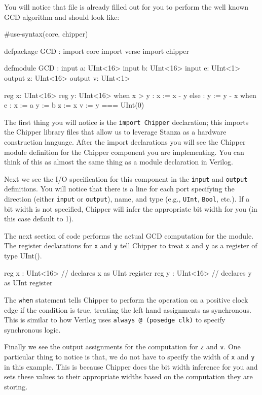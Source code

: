 You will notice that file is already filled out for you to perform the well known GCD algorithm and should look like:

\begin{stanza}
#use-syntax(core, chipper)

defpackage GCD :
   import core
   import verse
   import chipper

defmodule GCD :
   input a: UInt<16>
   input b: UInt<16>
   input e: UInt<1>
   output z: UInt<16>
   output v: UInt<1>

   reg x: UInt<16>
   reg y: UInt<16>
   when x > y :
      x := x - y
   else :
      y := y - x
   when e :
      x := a
      y := b
   z := x
   v := y === UInt(0)
\end{stanza}

The first thing you will notice is the \verb+import Chipper+ declaration; this imports the Chipper library files that allow us to leverage Stanza as a hardware construction language. After the import declarations you will see the Chipper module definition for the Chipper component you are implementing. You can think of this as almost the same thing as a module declaration in Verilog.

Next we see the I/O specification for this component in the \verb+input+ and \verb+output+ definitions. You will notice that there is a line for each port specifying the direction (either \verb+input+ or \verb+output+), name, and type (e.g., \verb+UInt+, \verb+Bool+, etc.). If a bit width is not specified, Chipper will infer the appropriate bit width for you (in this case default to 1). 

The next section of code performs the actual GCD computation for the module. The register declarations for \verb+x+ and \verb+y+ tell Chipper to treat \verb+x+ and \verb+y+ as a register of type UInt(). 

\begin{stanza}
reg x : UInt<16> // declares x as UInt register
reg y : UInt<16> // declares y as UInt register
\end{stanza}

The \verb+when+ statement tells Chipper to perform the operation on a positive clock edge if the condition is true, treating the left hand assignments as synchronous. This is similar to how Verilog uses \verb+always @ (posedge clk)+ to specify synchronous logic.

Finally we see the output assignments for the computation for \verb+z+ and \verb+v+. One particular thing to notice is that, we do not have to specify the width of \verb+x+ and \verb+y+ in this example. This is because Chipper does the bit width inference for you and sets these values to their appropriate widths based on the computation they are storing.

